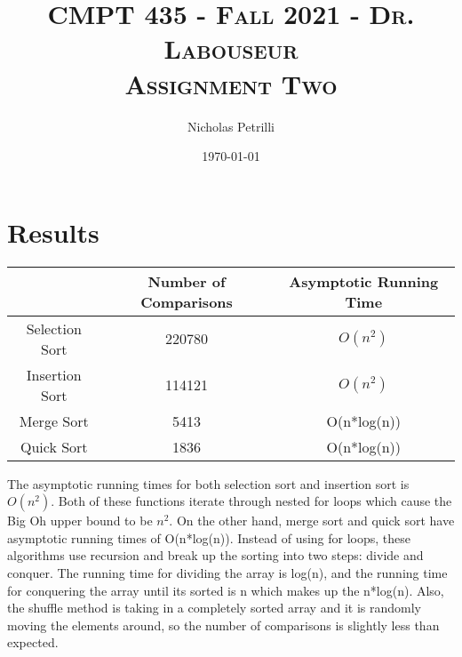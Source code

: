 \documentclass{article}
\author{Nicholas Petrilli }
\title{	
   \normalfont \normalsize 
   \textsc{CMPT 435 - Fall 2021 - Dr. Labouseur} \\[10pt] %
   \textsc{Assignment Two}
}
\date{\today}
\begin{document}
\maketitle

\section{Results}
\begin{center}
\begin{tabular}{||c c c||} 
 \hline
  & Number of Comparisons & Asymptotic Running Time  \\ [0.5ex] 
 \hline\hline
 Selection Sort & 220780 & $O(n^2)$ \\ 
 \hline
 Insertion Sort & 114121 & $O(n^2)$\\
 \hline
 Merge Sort & 5413 & O(n*log(n)) \\
 \hline
 Quick Sort & 1836 & O(n*log(n)) \\ [1ex]
 \hline
\end{tabular}
\end{center}

The asymptotic running times for both selection sort and insertion sort is $O(n^2)$. Both of these functions iterate through nested for loops which cause the Big Oh upper bound to be $n^2$. On the other hand, merge sort and quick sort have asymptotic running times of O(n*log(n)). Instead of using for loops, these algorithms use recursion and break up the sorting into two steps: divide and conquer. The running time for dividing the array is log(n), and the running time for conquering the array until its sorted is n which makes up the n*log(n). Also, the shuffle method is taking in a completely sorted array and it is randomly moving the elements around, so the number of comparisons is slightly less than expected. 
\end{document}
